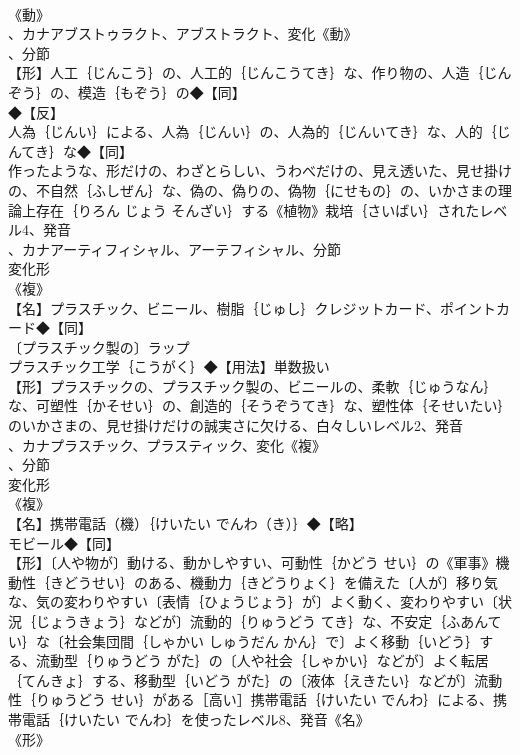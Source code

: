 \documentclass[8pt]{extreport}
\begin{document}
\begin{CJK}{UTF8}{min}
\\	《動》
\\	、カナアブストゥラクト、アブストラクト、変化《動》
\\	、分節
\\	【形】人工｛じんこう｝の、人工的｛じんこうてき｝な、作り物の、人造｛じんぞう｝の、模造｛もぞう｝の◆【同】
\\	◆【反】
\\	人為｛じんい｝による、人為｛じんい｝の、人為的｛じんいてき｝な、人的｛じんてき｝な◆【同】
\\	作ったような、形だけの、わざとらしい、うわべだけの、見え透いた、見せ掛けの、不自然｛ふしぜん｝な、偽の、偽りの、偽物｛にせもの｝の、いかさまの理論上存在｛りろん じょう そんざい｝する《植物》栽培｛さいばい｝されたレベル4、発音
\\	、カナアーティフィシャル、アーテフィシャル、分節
\\	変化形 
\\	《複》
\\	【名】プラスチック、ビニール、樹脂｛じゅし｝クレジットカード、ポイントカード◆【同】
\\	〔プラスチック製の〕ラップ
\\	プラスチック工学｛こうがく｝◆【用法】単数扱い
\\	【形】プラスチックの、プラスチック製の、ビニールの、柔軟｛じゅうなん｝な、可塑性｛かそせい｝の、創造的｛そうぞうてき｝な、塑性体｛そせいたい｝のいかさまの、見せ掛けだけの誠実さに欠ける、白々しいレベル2、発音
\\	、カナプラスチック、プラスティック、変化《複》
\\	、分節
\\	変化形 
\\	《複》
\\	【名】携帯電話（機）｛けいたい でんわ（き）｝◆【略】
\\	モビール◆【同】
\\	【形】〔人や物が〕動ける、動かしやすい、可動性｛かどう せい｝の《軍事》機動性｛きどうせい｝のある、機動力｛きどうりょく｝を備えた〔人が〕移り気な、気の変わりやすい〔表情｛ひょうじょう｝が〕よく動く、変わりやすい〔状況｛じょうきょう｝などが〕流動的｛りゅうどう てき｝な、不安定｛ふあんてい｝な〔社会集団間｛しゃかい しゅうだん かん｝で〕よく移動｛いどう｝する、流動型｛りゅうどう がた｝の〔人や社会｛しゃかい｝などが〕よく転居｛てんきょ｝する、移動型｛いどう がた｝の〔液体｛えきたい｝などが〕流動性｛りゅうどう せい｝がある［高い］携帯電話｛けいたい でんわ｝による、携帯電話｛けいたい でんわ｝を使ったレベル8、発音《名》
\\	《形》

\end{CJK}
\end{document}
